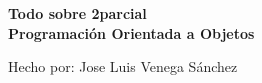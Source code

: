 \thispagestyle{empty}
\begin{center}
\vspace*{\fill}
	\textbf{\huge \vspace*{0.1in} Todo sobre 2 parcial\\ Programación Orientada a Objetos}
\vspace*{\fill}

\vspace{1in}
Hecho por: Jose Luis Venega Sánchez
\end{center}
